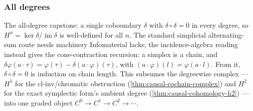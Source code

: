\subsubsection{All degrees}

\begin{theorem}\label{thm:causal-cohomology-n}\leanok{}
The all-degree capstone: a single coboundary $\delta$ with
$\delta \circ \delta = 0$ in every degree, so
$H^n = \ker\delta / \operatorname{im}\delta$ is well-defined for all $n$. The
standard simplicial alternating-sum route needs machinery Infomaterial lacks; the
incidence-algebra reading instead gives the cone-contraction recursion:
a simplex is a chain, and
$\delta\varphi(a\!\cdot\!\tau) =
\varphi(\tau) - \delta(a\!\cdot\!\varphi)(\tau)$, with
$(a\!\cdot\!\varphi)(l) = \varphi(a\!\cdot\! l)$. From it,
$\delta\circ\delta = 0$ is induction on chain length. This subsumes the
degreewise complex --- $H^1$ for the $\mathrm{cl\text{-}inv}$/chromatic
obstruction (\cref{thm:causal-cochain-complex}) and $H^2$ for the exact
symplectic form's ambient degree (\cref{thm:causal-cohomology-h2}) --- into
one graded object $C^0 \to C^1 \to C^2 \to \cdots$.
\end{theorem}
